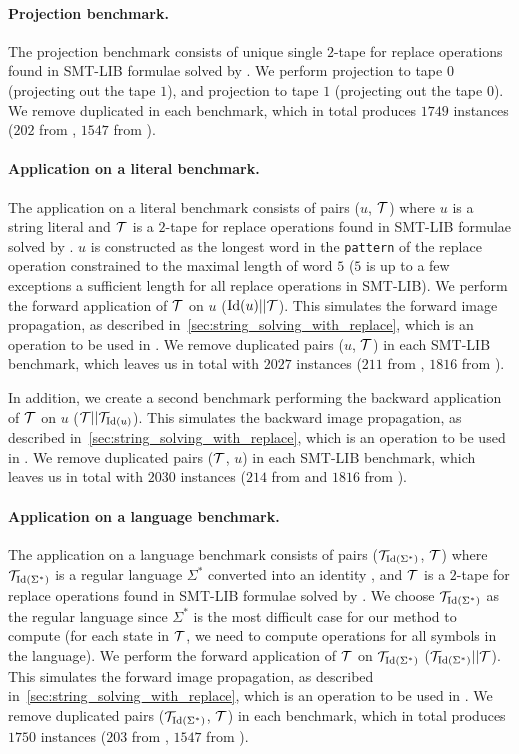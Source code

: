 \paragraph{Projection benchmark.}
The projection benchmark consists of unique single $2$-tape \nfts for replace operations found in SMT-LIB formulae solved by \noodler.
We perform projection to tape $0$ (projecting out the tape $1$), and projection to tape $1$ (projecting out the tape $0$).
We remove duplicated \nfts in each benchmark, which in total produces $1749$ instances ($202$ from \webapp, $1547$ from \transducerPlus).

\paragraph{Application on a literal benchmark.}
The application on a literal benchmark consists of pairs ($u$, $\mathcal{T}$) where $u$ is a string literal and $\mathcal{T}$ is a $2$-tape \nft for replace operations found in SMT-LIB formulae solved by \noodler.
$u$ is constructed as the longest word in the \texttt{pattern} of the replace operation constrained to the maximal length of word $5$ ($5$ is up to a few exceptions a sufficient length for all replace operations in SMT-LIB).
We perform the forward application of $\mathcal{T}$ on $u$ ($\text{Id}(u) || \mathcal{T} $).
This simulates the forward image propagation, as described in~\ref{sec:string_solving_with_replace}, which is an operation to be used in \noodler.
We remove duplicated pairs ($u$, $\mathcal{T}$) in each SMT-LIB benchmark, which leaves us in total with $2027$ instances ($211$ from \webapp, $1816$ from \transducerPlus).

In addition, we create a second benchmark performing the backward application of $\mathcal{T}$ on $u$ ($ \mathcal{T} || \mathcal{T}_{\text{Id}(u)}$).
This simulates the backward image propagation, as described in~\ref{sec:string_solving_with_replace}, which is an operation to be used in \noodler.
We remove duplicated pairs ($\mathcal{T}$, $u$) in each SMT-LIB benchmark, which leaves us in total with $2030$ instances ($214$ from \webapp and $1816$ from \transducerPlus).

\paragraph{Application on a language benchmark.}
The application on a language benchmark consists of pairs ($\mathcal{T}_{\text{Id}(\Sigma^*)}$, $\mathcal{T}$) where $\mathcal{T}_{\text{Id}(\Sigma^*)}$ is a regular language $\Sigma^*$ converted into an identity \nft, and $\mathcal{T}$ is a $2$-tape \nft for replace operations found in SMT-LIB formulae solved by \noodler.
We choose $\mathcal{T}_{\text{Id}(\Sigma^*)}$ as the regular language since $\Sigma^*$ is the most difficult case for our method to compute (for each state in $\mathcal{T}$, we need to compute operations for all symbols in the language).
We perform the forward application of $\mathcal{T}$ on $\mathcal{T}_{\text{Id}(\Sigma^*)}$ ($\mathcal{T}_{\text{Id}(\Sigma^*)} || \mathcal{T} $).
This simulates the forward image propagation, as described in~\ref{sec:string_solving_with_replace}, which is an operation to be used in \noodler.
We remove duplicated pairs ($\mathcal{T}_{\text{Id}(\Sigma^*)}$, $\mathcal{T}$) in each benchmark, which in total produces $1750$ instances ($203$ from \webapp, $1547$ from \transducerPlus).

